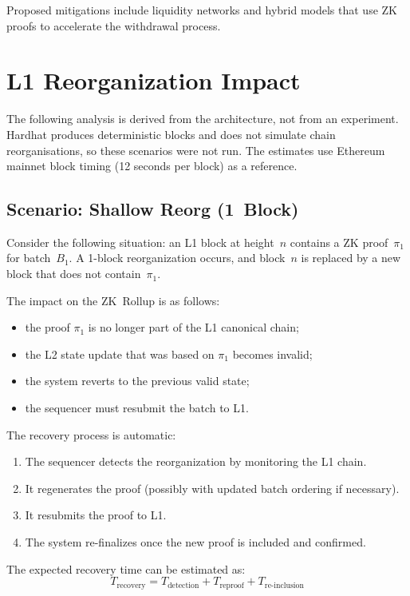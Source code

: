 Proposed mitigations include liquidity networks and hybrid models that use ZK proofs to accelerate the withdrawal process.

\section{L1 Reorganization Impact}

The following analysis is derived from the architecture, not from an experiment. Hardhat produces deterministic blocks and does not simulate chain reorganisations, so these scenarios were not run. The estimates use Ethereum mainnet block timing (12 seconds per block) as a reference.

\subsection{Scenario: Shallow Reorg (1~Block)}

Consider the following situation: an L1 block at height~$n$ contains a ZK proof~$\pi_1$ for batch~$B_1$. A 1-block reorganization occurs, and block~$n$ is replaced by a new block that does not contain~$\pi_1$.

The impact on the ZK~Rollup is as follows:
\begin{itemize}
    \item the proof $\pi_1$ is no longer part of the L1 canonical chain;
    \item the L2 state update that was based on $\pi_1$ becomes invalid;
    \item the system reverts to the previous valid state;
    \item the sequencer must resubmit the batch to L1.
\end{itemize}

The recovery process is automatic:
\begin{enumerate}
    \item The sequencer detects the reorganization by monitoring the L1 chain.
    \item It regenerates the proof (possibly with updated batch ordering if necessary).
    \item It resubmits the proof to L1.
    \item The system re-finalizes once the new proof is included and confirmed.
\end{enumerate}

The expected recovery time can be estimated as:
\begin{equation}
T_{\text{recovery}} = T_{\text{detection}} + T_{\text{reproof}} + T_{\text{re-inclusion}}
\end{equation}

